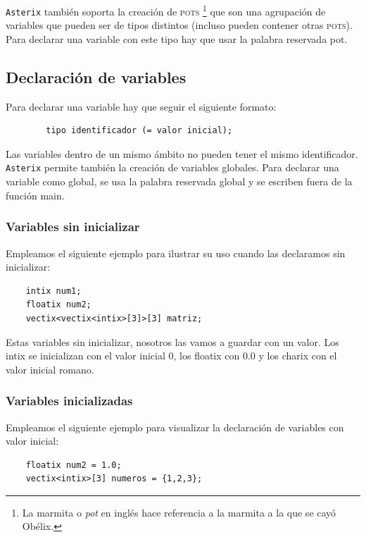 \documentclass[a4paper, 10pt]{article}
\newcommand{\atx}{\texttt{Asterix} }
\begin{document}
    \atx también soporta la creación de \textsc{pots} \footnote{La marmita o
    \textit{pot} en inglés hace referencia a la marmita a la que se cayó
    Obélix.} que son una agrupación de variables que pueden ser de tipos
    distintos (incluso pueden contener otras \textsc{pots}). Para declarar una
    variable con este tipo hay que usar la palabra reservada \textsf{pot}.

    \subsection*{Declaración de variables}
    Para declarar una variable hay que seguir el siguiente formato: 
    \begin{verbatim}
        tipo identificador (= valor inicial);
    \end{verbatim}
    
    Las variables dentro de un mismo ámbito no pueden tener el mismo identificador. 
    \atx permite también la creación de variables globales. Para declarar una variable como 
    global, se usa la palabra reservada \textsf{global} y se escriben fuera de
    la función main. 

    \subsubsection*{Variables sin inicializar}
    Empleamos el siguiente ejemplo para ilustrar su uso cuando
    las declaramos sin inicializar:

    \begin{verbatim}
    intix num1;
    floatix num2;
    vectix<vectix<intix>[3]>[3] matriz;
    \end{verbatim}

    Estas variables sin inicializar, nosotros las vamos a guardar con un valor.
    Los intix se inicializan con el valor inicial 0, los floatix con 0.0 y los
    charix con el valor inicial romano.
    
    \subsubsection*{Variables inicializadas}
    Empleamos el siguiente ejemplo para visualizar la declaración de variables
    con valor inicial:

    \begin{verbatim}
    floatix num2 = 1.0;
    vectix<intix>[3] numeros = {1,2,3};
    \end{verbatim}
\end{document}
